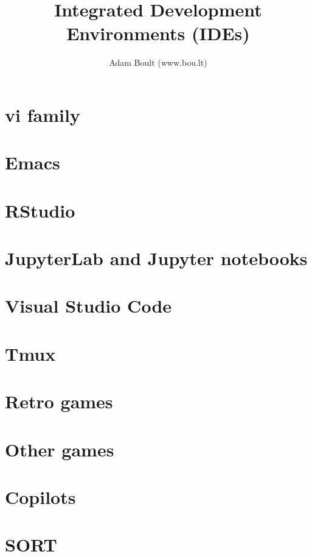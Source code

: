 \documentclass[oneside]{book}
\begin{document}
\author{Adam Boult (www.bou.lt)}
\title{Integrated Development Environments (IDEs)}
\maketitle

\setcounter{tocdepth}{0}
\tableofcontents



\part{vi family}



\part{Emacs}


\part{RStudio}


\part{JupyterLab and Jupyter notebooks}


\part{Visual Studio Code}


\part{Tmux}


\part{Retro games}



\part{Other games}





\part{Copilots}


\part{SORT}

\end{document}
